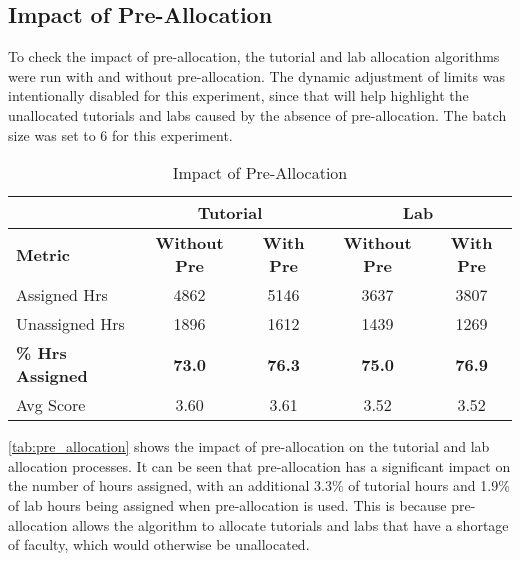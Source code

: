 \subsection{Impact of Pre-Allocation}

To check the impact of pre-allocation, the tutorial and lab allocation algorithms were run with and without pre-allocation. The dynamic adjustment of limits was intentionally disabled for this experiment, since that will help highlight the unallocated tutorials and labs caused by the absence of pre-allocation. The batch size was set to 6 for this experiment.

\begin{table}[H]
  \centering
  \begin{tabular}{|l|c|c|c|c|}
    \hline
                             & \multicolumn{2}{c|}{Tutorial} & \multicolumn{2}{c|}{Lab}                                            \\ \hline
    \textbf{Metric}          & \textbf{Without Pre}          & \textbf{With Pre}        & \textbf{Without Pre} & \textbf{With Pre} \\ \hline
    Assigned Hrs             & 4862                          & 5146                     & 3637                 & 3807              \\ \hline
    Unassigned Hrs           & 1896                          & 1612                     & 1439                 & 1269              \\ \hline
    \textbf{\% Hrs Assigned} & \textbf{73.0}                 & \textbf{76.3}            & \textbf{75.0}        & \textbf{76.9}     \\ \hline
    Avg Score                & 3.60                          & 3.61                     & 3.52                 & 3.52              \\ \hline
  \end{tabular}
  \caption{Impact of Pre-Allocation}
  \label{tab:pre_allocation}
\end{table}

\autoref{tab:pre_allocation} shows the impact of pre-allocation on the tutorial and lab allocation processes. It can be seen that pre-allocation has a significant impact on the number of hours assigned, with an additional 3.3\% of tutorial hours and 1.9\% of lab hours being assigned when pre-allocation is used. This is because pre-allocation allows the algorithm to allocate tutorials and labs that have a shortage of faculty, which would otherwise be unallocated.

